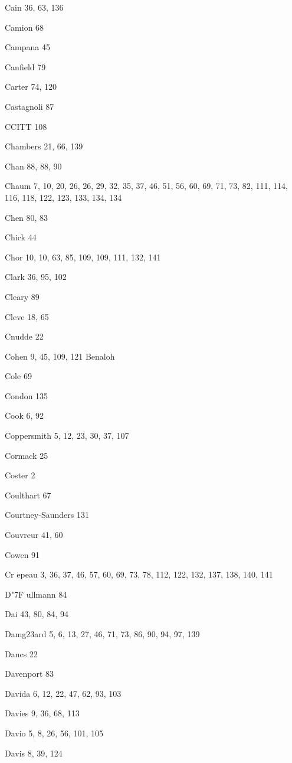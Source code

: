 \begin{theindex}
\item Cain 36, 63, 136
\item Camion 68
\item Campana 45
\item Canfield 79
\item Carter 74, 120
\item Castagnoli 87
\item CCITT 108
\item Chambers 21, 66, 139
\item Chan 88, 88, 90
\item Chaum 7, 10, 20, 26, 26, 29, 32, 35, 37, 46, 51, 56, 60, 69, 71, 73, 82, 111, 114, 116, 118, 122, 123, 133, 134, 134
\item Chen 80, 83
\item Chick 44
\item Chor 10, 10, 63, 85, 109, 109, 111, 132, 141
\item Clark 36, 95, 102
\item Cleary 89
\item Cleve 18, 65
\item Cnudde 22
\item Cohen 9, 45, 109, 121
 Benaloh
\item Cole 69
\item Condon 135
\item Cook 6, 92
\item Coppersmith 5, 12, 23, 30, 37, 107
\item Cormack 25
\item Coster 2
\item Coulthart 67
\item Courtney-Saunders 131
\item Couvreur 41, 60
\item Cowen 91
\item Cr{ e}peau 3, 36, 37, 46, 57, 60, 69, 73, 78, 112, 122, 132, 137, 138, 140, 141
\item D{\accent "7F u}llmann 84
\item Dai 43, 80, 84, 94
\item Damg{\accent 23a}rd 5, 6, 13, 27, 46, 71, 73, 86, 90, 94, 97, 139
\item Dancs 22
\item Davenport 83
\item Davida 6, 12, 22, 47, 62, 93, 103
\item Davies 9, 36, 68, 113
\item Davio 5, 8, 26, 56, 101, 105
\item Davis 8, 39, 124

\end{theindex}
